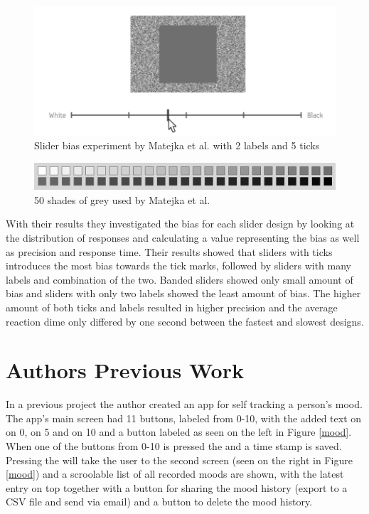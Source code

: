\begin{figure}[h!]
    \centering
    \includegraphics[width=1\textwidth]{figures/mate_ex.png}
    \caption{Slider bias experiment by Matejka et al.\cite{grey} with 2 labels and 5 ticks}
    \label{mate_ex}
\end{figure}

\begin{figure}[h!]
    \centering
    \includegraphics[width=1\textwidth]{figures/50shades.png}
    \caption{50 shades of grey used by Matejka et al.\cite{grey}}
    \label{50shades}
\end{figure}

With their results they investigated the bias for each slider design by looking at the distribution of responses and calculating a  value representing the bias as well as precision and response time. Their results showed that sliders with ticks introduces the most bias towards the tick marks, followed by sliders with many labels and combination of the two. Banded sliders showed only small amount of bias and sliders with only two labels showed the least amount of bias. The higher amount of both ticks and labels resulted in higher precision and the average reaction dime only differed by one second between the fastest and slowest designs.







\section{Authors Previous Work}
In a previous project the author created an app for self tracking a person's mood\cite{mood}. The app's main screen had 11 buttons, labeled from 0-10, with the added text on  on 0,  on 5 and  on 10 and a button labeled  as seen on the left in Figure \ref{mood}. When one of the buttons from 0-10 is pressed the  and a time stamp is saved. Pressing the  will take the user to the second screen (seen on the right in Figure \ref{mood}) and a scroolable list of all recorded moods are shown, with the latest entry on top together with a button for sharing the mood history (export to a CSV file and send via email) and a button to delete the mood history.


